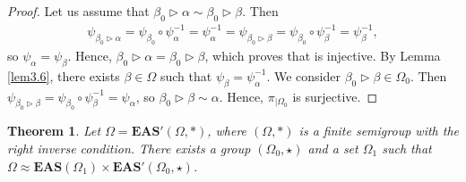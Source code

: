 \documentclass[10pt,a4paper]{amsart}
\numberwithin{equation}{section}
\newtheorem{Theorem}{Theorem}[section]
\newcommand{\eas}{\mathbf{EAS}}
\begin{document}
\begin{proof}
Let us assume that $\beta_0\triangleright \alpha\sim \beta_0\triangleright \beta$. Then
\begin{align*}
\psi_{\beta_0\triangleright \alpha}=\psi_{\beta_0}\circ \psi_\alpha^{-1}=\psi_{\alpha}^{-1}
=\psi_{\beta_0\triangleright \beta}=\psi_{\beta_0}\circ \psi_\beta^{-1}=\psi_{\beta}^{-1},
\end{align*}
so $\psi_\alpha=\psi_\beta$. Hence, $\beta_0\triangleright\alpha=\beta_0\triangleright \beta$, which proves that  is injective.
By Lemma \ref{lem3.6}, there exists $\beta \in \Omega$ such that $\psi_\beta=\psi_\alpha^{-1}$. We consider $\beta_0\triangleright \beta \in \Omega_0$. Then
$\psi_{\beta_0\triangleright \beta}=\psi_{\beta_0}\circ \psi_\beta^{-1}=\psi_\alpha$,
so $\beta_0\triangleright \beta\sim \alpha$. Hence, $\pi_{\mid \Omega_0}$ is surjective.
\end{proof}

\begin{Theorem} \label{theo3.8}
Let $\Omega=\eas'(\Omega,*)$, where $(\Omega,*)$ is a finite semigroup with the right inverse condition. There exists a group $(\Omega_0,\star)$ and a set $\Omega_1$ such that
$\Omega\approx \eas(\Omega_1)\times \eas'(\Omega_0,\star)$.
\end{Theorem}
\end{document}
